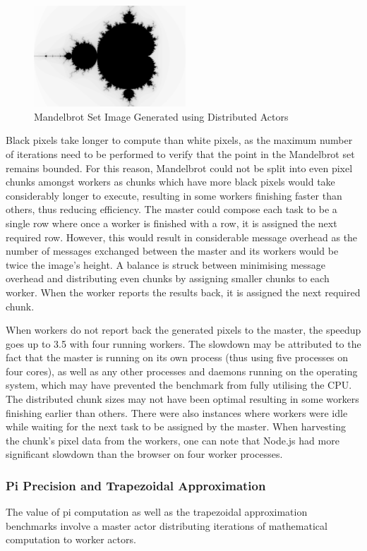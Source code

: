 \documentclass[oneside]{um-fict}
\begin{document}
\begin{figure}[H]
    \begin{centering}
        \includegraphics[width=215px]{resources/mandelbrot.png}
        \caption{Mandelbrot Set Image Generated using Distributed Actors}
    \end{centering}
\end{figure}
Black pixels take longer to compute than white pixels, as the maximum number of iterations need to be performed to verify that the point in the Mandelbrot set remains bounded. For this reason, Mandelbrot could not be split into even pixel chunks amongst workers as chunks which have more black pixels would take considerably longer to execute, resulting in some workers finishing faster than others, thus reducing efficiency. The master could compose each task to be a single row where once a worker is finished with a row, it is assigned the next required row. However, this would result in considerable message overhead as the number of messages exchanged between the master and its workers would be twice the image's height. A balance is struck between minimising message overhead and distributing even chunks by assigning smaller chunks to each worker. When the worker reports the results back, it is assigned the next required chunk.

When workers do not report back the generated pixels to the master, the speedup goes up to 3.5 with four running workers. The slowdown may be attributed to the fact that the master is running on its own process (thus using five processes on four cores), as well as any other processes and daemons running on the operating system, which may have prevented the benchmark from fully utilising the CPU. The distributed chunk sizes may not have been optimal resulting in some workers finishing earlier than others. There were also instances where workers were idle while waiting for the next task to be assigned by the master. When harvesting the chunk's pixel data from the workers, one can note that Node.js had more significant slowdown than the browser on four worker processes.
\subsubsection{Pi Precision and Trapezoidal Approximation}
The value of pi computation as well as the trapezoidal approximation benchmarks involve a master actor distributing iterations of mathematical computation to worker actors.
\end{document}
